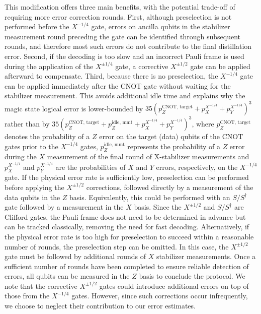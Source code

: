 \documentclass[%
 reprint,
superscriptaddress,
 amsmath,amssymb,
 aps,
]{revtex4-2}
\begin{document}
This modification offers three main benefits, with the potential trade-off of requiring more error correction rounds. First, although preselection is not performed before the $X^{-1/4}$ gate, errors on ancilla qubits in the stabilizer measurement round preceding the gate can be identified through subsequent rounds, and therefore most such errors do not contribute to the final distillation error. Second, if the decoding is too slow and an incorrect Pauli frame is used during the application of the $X^{\pm 1/4}$ gate, a corrective $X^{\pm 1/2}$ gate can be applied afterward to compensate. Third, because there is no preselection, the $X^{-1/4}$ gate can be applied immediately after the CNOT gate without waiting for the stabilizer measurement. This avoids additional idle time and explains why the magic state logical error is lower-bounded by $35(p^{\text{CNOT, target}}_Z + p^{X^{-1/4}}_X + p^{X^{-1/4}}_Y)^3$ rather than by $35(p^{\text{CNOT, target}}_Z + p^{\text{idle, mmt}}_{Z} + p^{X^{-1/4}}_X + p^{X^{-1/4}}_Y)^3$, where $p^{\text{CNOT, target}}_Z$ denotes the probability of a $Z$ error on the target (data) qubits of the CNOT gates prior to the $X^{-1/4}$ gates, $p^{\text{idle, mmt}}_{Z}$ represents the probability of a $Z$ error during the $X$ measurement of the final round of X-stabilizer measurements and $p^{X^{-1/4}}_X$ and $p^{X^{-1/4}}_Y$ are the probabilities of $X$ and $Y$ errors, respectively, on the $X^{-1/4}$ gate. If the physical error rate is sufficiently low, preselection can be performed before applying the $X^{\pm 1/2}$ corrections, followed directly by a measurement of the data qubits in the $Z$ basis. Equivalently, this could be performed with an $S/S^\dagger$ gate followed by a measurement in the $X$ basis. Since the $X^{\pm 1/2}$ and $S/S^\dagger$ are Clifford gates, the Pauli frame does not need to be determined in advance but can be tracked classically, removing the need for fast decoding. Alternatively, if the physical error rate is too high for preselection to succeed within a reasonable number of rounds, the preselection step can be omitted. In this case, the $X^{\pm 1/2}$ gate must be followed by additional rounds of $X$ stabilizer measurements. Once a sufficient number of rounds have been completed to ensure reliable detection of errors, all qubits can be measured in the $Z$ basis to conclude the protocol. We note that the corrective $X^{\pm 1/2}$ gates could introduce additional errors on top of those from the $X^{-1/4}$ gates. However, since such corrections occur infrequently, we choose to neglect their contribution to our error estimates.
\end{document}
